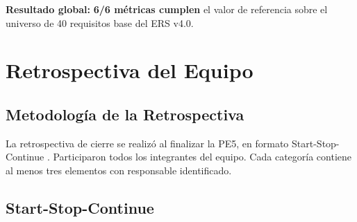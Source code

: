 \documentclass[11pt,a4paper]{article}
\begin{document}
\textbf{Resultado global:} \textbf{6/6 métricas cumplen} el valor de referencia sobre el universo de 40 requisitos base del ERS v4.0.

\section{Retrospectiva del Equipo}
\label{sec:retrospectiva}

\subsection{Metodología de la Retrospectiva}

La retrospectiva de cierre se realizó al finalizar la PE5, en formato Start-Stop-Continue \cite{swebok2024,pmbok7}. Participaron todos los integrantes del equipo. Cada categoría contiene al menos tres elementos con responsable identificado.

\subsection{Start-Stop-Continue}
\end{document}
